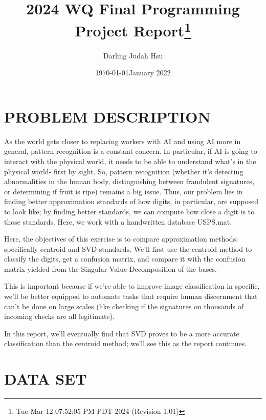 \documentclass[dvipsnames,12pt]{article} %
\title{2024 WQ Final Programming Project Report\footnote{Tue Mar 12 07:52:05 PM PDT 2024 (Revision 1.01)}}
\author{Darling Judah Hsu} %
\date{\today}
\date{January 2022}
\begin{document}
\maketitle
\tableofcontents
\newpage

  \section{PROBLEM DESCRIPTION}
    \label{SECT 01:PROBLEM DESCRIPTION}

      \hskip 12pt As the world gets closer to replacing workers with AI and using AI more in general, pattern recognition is a constant concern. In particular, if AI is going to interact with the physical world, it needs to be able to understand what's in the physical world- first by sight. So, pattern recognition (whether it's detecting abnormalities in the human body, distinguishing between fraudulent signatures, or determining if fruit is ripe) remains a big issue. Thus, our problem lies in finding better approximation standards of how digits, in particular, are supposed to look like; by finding better standards, we can compute how close a digit is to those standards. Here, we work with a handwritten database USPS.mat.

      \vskip 06pt

      \hskip 12pt Here, the objectives of this exercise is to compare approximation methods: specifically centroid and SVD standards. We'll first use the centroid method to classify the digits, get a confusion matrix, and compare it with the confusion matrix yielded from the Singular Value Decomposition of the bases.

      \vskip 06pt

      \hskip 12pt This is important because if we're able to improve image classification in specific, we'll be better equipped to automate tasks that require human discernment that can't be done on large scales (like checking if the signatures on thousands of incoming checks are all legitimate).

      \vskip 06pt

      \hskip 12pt In this report, we'll eventually find that SVD proves to be a more accurate classification than the centroid method; we'll see this as the report continues.



  \section{DATA SET}
    \label{SECT 02:DATA}
\end{document}

